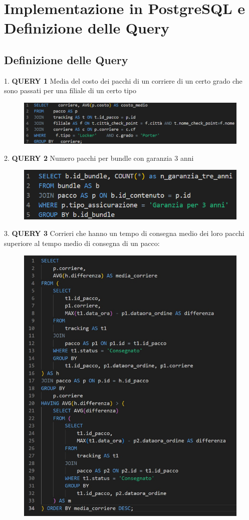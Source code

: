 \section{Implementazione in PostgreSQL e Definizione
delle Query}

\subsection{Definizione delle Query}

1. \textbf{QUERY 1} Media del costo dei pacchi di un corriere di un certo grado che sono passati per una filiale di un certo tipo
  \begin{figure}[H]
\centering
\includegraphics[width=0.8 \textwidth]{Resources/QUERY1.png}
\label{Q1}
\end{figure}
2. \textbf{QUERY 2} Numero pacchi per bundle con garanzia 3 anni
\begin{figure}[H]
\centering
\includegraphics[width=0.6 \textwidth]{Resources/QUERY2.png}
\label{Q2}
\end{figure}
3. \textbf{QUERY 3} Corrieri che hanno un tempo di consegna medio dei loro pacchi superiore al tempo medio di consegna di un pacco:
\begin{figure}[H]
\centering
\includegraphics[width=0.6 \textwidth]{Resources/QUERY3.png}
\label{Q3}
\end{figure}
